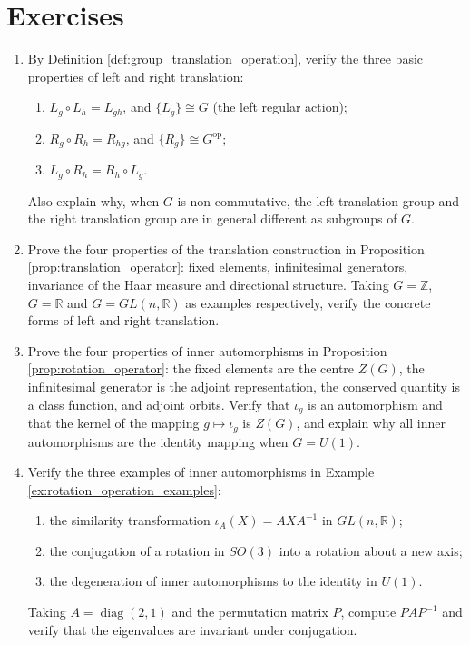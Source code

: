 \section*{Exercises}

\begin{enumerate}[leftmargin=3em, label=\textbf{Exercise \arabic*}]
    \item By Definition \ref{def:group_translation_operation}, verify the three basic properties of left and right translation:
    \begin{enumerate}[label=(\roman*)]
        \item $L_g\circ L_h=L_{gh}$, and $\{L_g\}\cong G$ (the left regular action);
        \item $R_g\circ R_h=R_{hg}$, and $\{R_g\}\cong G^{\text{op}}$;
        \item $L_g\circ R_h=R_h\circ L_g$.
    \end{enumerate}
    Also explain why, when $G$ is non-commutative, the left translation group and the right translation group are in general different as subgroups of $G$.

    \item Prove the four properties of the translation construction in Proposition \ref{prop:translation_operator}:
    fixed elements, infinitesimal generators, invariance of the Haar measure and directional structure.
    Taking $G=\mathbb{Z}$, $G=\mathbb{R}$ and $G=GL(n,\mathbb{R})$ as examples respectively,
    verify the concrete forms of left and right translation.

    \item Prove the four properties of inner automorphisms in Proposition \ref{prop:rotation_operator}:
    the fixed elements are the centre $Z(G)$, the infinitesimal generator is the adjoint representation, the conserved quantity is a class function, and adjoint orbits.
    Verify that $\iota_g$ is an automorphism and that the kernel of the mapping $g\mapsto\iota_g$ is $Z(G)$,
    and explain why all inner automorphisms are the identity mapping when $G=U(1)$.

    \item Verify the three examples of inner automorphisms in Example \ref{ex:rotation_operation_examples}:
    \begin{enumerate}[label=(\roman*)]
        \item the similarity transformation $\iota_A(X)=AXA^{-1}$ in $GL(n,\mathbb{R})$;
        \item the conjugation of a rotation in $SO(3)$ into a rotation about a new axis;
        \item the degeneration of inner automorphisms to the identity in $U(1)$.
    \end{enumerate}
    Taking $A=\operatorname{diag}(2,1)$ and the permutation matrix $P$,
    compute $PAP^{-1}$ and verify that the eigenvalues are invariant under conjugation.


\end{enumerate}
